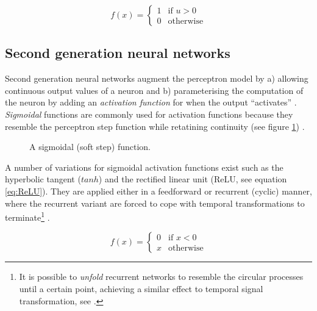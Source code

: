\documentclass[report.tex]{subfiles}
\begin{document}
\begin{equation} \label{eq:perceptron}
f(x) = \begin{cases}
	 1 & \text{if } u > 0\\
	 0 & \text{otherwise}
       \end{cases}
\end{equation}

\subsection{Second generation neural networks}
Second generation neural networks augment the perceptron model by
a) allowing continuous output values of a neuron and b) parameterising
the computation of the neuron by adding an \textit{activation function}
 for when the output ``activates'' 
\cite{Maass1997}.
\textit{Sigmoidal} functions are commonly used for activation functions
because they resemble the perceptron step function while 
retatining continuity (see figure \ref{fig:sigmoid})
\cite{Maass1997}.

\begin{figure}
\centering
{}
\caption{A sigmoidal (soft step) function.}
\label{fig:sigmoid}
\end{figure}

A number of variations for sigmoidal activation functions exist such as the 
hyperbolic tangent ($tanh$) and
the rectified linear unit  (ReLU, see equation \ref{eq:ReLU}). 
They are applied either in a feedforward or recurrent (cyclic) manner, where
the recurrent variant are forced to cope with temporal transformations to
terminate\footnote{It is possible to \textit{unfold} recurrent
networks to resemble the circular processes until a certain point, achieving
a similar effect to temporal signal transformation, see \cite{Mozer1995}.}
\cite{Schmidhuber2014}.

\begin{equation} \label{eq:ReLU}
f(x) = \begin{cases}
         0 & \text{if } x < 0 \\
	 x & \text{otherwise}
       \end{cases}
\end{equation}
\end{document}
